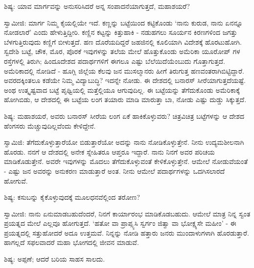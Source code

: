 ಶಿಷ್ಯ: ಯಾವ ಮಾರ್ಗವನ್ನು ಅನುಸರಿಸಿದರೆ ಅನ್ನ ಸಂಪಾದನೆಯಾಗುತ್ತದೆ, ಮಹಾಶಯರೆ?

ಸ್ವಾಮೀಜಿ: ಮಾರ್ಗ ನಿಮ್ಮ ಕೈಯಲ್ಲಿಯೇ ಇದೆ. ಕಣ್ಣನ್ನು ಬಟ್ಟೆಯಿಂದ ಕಟ್ಟಿಕೊಂಡು ‘ನಾನು ಕುರುಡ, ನಾನು ಏನನ್ನೂ ನೋಡಲಾರೆ’ ಎಂದು ಹೇಳುತ್ತಿದ್ದೀರಿ. ಕಣ್ಣಿನ ಕಟ್ಟನ್ನು ಕಿತ್ತುಹಾಕಿ - ನಡುಹಗಲು ಸೂರ್ಯನ ಕಿರಣಗಳಿಂದ ಜಗತ್ತು ಬೆಳಗುತ್ತಿರುವುದು ಕಣ್ಣಿಗೆ ಬೀಳುತ್ತದೆ. ಹಣ ದೊರೆಯದಿದ್ದರೆ ಜಹಜಿನಲ್ಲಿ ಕೂಲಿಯಾಗಿ ವಿದೇಶಕ್ಕೆ ಹೊರಟುಹೋಗಿ. ಸ್ವದೇಶಿ ಬಟ್ಟೆ, ಚೌಕ, ಮೊರ, ಪೊರಕೆ ಇವುಗಳನ್ನು ತಲೆಯ ಮೇಲೆ ಹೊತ್ತುಕೊಂಡು ಅಮೆರಿಕಾ ಯೂರೋಪ್ ಗಳ ರಸ್ತೆಗಳಲ್ಲಿ ತಿರುಗಿ; ಹಿಂದೂದೇಶದ ಪದಾರ್ಥಗಳಿಗೆ ಈಗಲೂ ಎಷ್ಟು ಬೆಲೆಯಿದೆಯೆಂಬುದು ಗೊತ್ತಾಗುತ್ತದೆ. ಅಮೆರಿಕಾದಲ್ಲಿ ನೋಡಿದೆ - ಹೂಗ್ಲಿ ಜಿಲ್ಲೆಯ ಕೆಲವು ಜನ ಮುಸಲ್ಮಾನರು ಹೀಗೆ ತಿರುಗುತ್ತ ಹಣವಂತರಾಗಿಬಿಟ್ಟಿದ್ದಾರೆ. ಅವರದಕ್ಕಿಂತಲೂ ಕಡೆಯೇ ನಿಮ್ಮ ವಿದ್ಯಾಬುದ್ಧಿ? ಇದನ್ನೇ ನೋಡು. ಈ ದೇಶದಲ್ಲಿ ಬನಾರಸ್ ಸೀರೆಯಾಗುತ್ತದೆಯಷ್ಟೆ. ಅಂಥ ಉತ್ಕೃಷ್ಟವಾದ ಬಟ್ಟೆ ಪೃಥ್ವಿಯಲ್ಲಿ ಮತ್ತೆಲ್ಲಿಯೂ ಆಗುವುದಿಲ್ಲ. ಈ ಬಟ್ಟೆಯನ್ನು ತೆಗೆದುಕೊಂಡು ಅಮೆರಿಕಾಕ್ಕೆ ಹೋಗಿಬಿಡು, ಆ ದೇಶದಲ್ಲಿ ಈ ಬಟ್ಟೆಯ ಲಂಗ ತಯಾರು ಮಾಡಿ ಮಾರುತ್ತಾ ಬಾ, ನೋಡು ಎಷ್ಟು ದುಡ್ಡು ಸಿಕ್ಕುತ್ತದೆ.

ಶಿಷ್ಯ: ಮಹಾಶಯರೆ, ಅವರು ಬನಾರಸ್ ಸೀರೆಯ ಲಂಗ ಏಕೆ ಹಾಕಿಕೊಳ್ಳುವರು? ಚಿತ್ರವಿಚಿತ್ರ ಬಟ್ಟೆಗಳನ್ನು ಆ ದೇಶದ ಹೆಂಗಸರು ಮೆಚ್ಚುವುದಿಲ್ಲವೆಂದು ಕೇಳಿದ್ದೇನೆ.

ಸ್ವಾಮಿಜಿ: ತೆಗೆದುಕೊಳ್ಳುತ್ತಾರೆಯೋ ಬಿಡುತ್ತಾರೆಯೋ ಅದನ್ನು ನಾನು ನೋಡಿಕೊಳ್ಳುತ್ತೇನೆ. ನೀನು ಉದ್ಯಮಶೀಲನಾಗಿ ಹೊರಡು. ನನಗೆ ಆ ದೇಶದಲ್ಲಿ ಅನೇಕ ಸ್ನೇಹಿತರೂ ಆಪ್ತರೂ ಇದ್ದಾರೆ. ನಾನು ನಿನಗೆ ಅವರ ಪರಿಚಯ ಮಾಡಿಕೊಡುತ್ತೇನೆ. ಅವರೇ ಇವುಗಳನ್ನು ಮೊದಲು ತೆಗೆದುಕೊಳ್ಳುವಂತೆ ಕೇಳಿಕೊಳ್ಳುತ್ತೇನೆ. ಆಮೇಲೆ ನೋಡುವೆಯಂತೆ - ಎಷ್ಟು ಜನ ಅವರನ್ನು ಅನುಕರಣ ಮಾಡುತ್ತಾರೆ ಅಂತ. ನೀನು ಆಮೇಲೆ ಪದಾರ್ಥಗಳನ್ನು ಒದಗಿಸಲಾರದೆ ಹೋಗುವೆ.

ಶಿಷ್ಯ: ಕಸುಬನ್ನು ಕೈಕೊಳ್ಳುವುದಕ್ಕೆ ಮೂಲಧನವೆಲ್ಲಿಂದ ತರೋಣ?

ಸ್ವಾಮೀಜಿ: ನಾನು ಏನುಮಾಡಬಹುದೆಂದರೆ, ನಿನಗೆ ಕಾರ್ಯಾರಂಭ ಮಾಡಿಕೊಡಬಹುದು. ಆಮೇಲೆ ಮಾತ್ರ ನಿನ್ನ ಸ್ವಂತ ಪ್ರಯತ್ನದ ಮೇಲೆ ಎಲ್ಲವೂ ಹೋಗುತ್ತದೆ. ‘ಹತೋ ವಾ ಪ್ರಾಪ್ಸ್ಯಸಿ ಸ್ವರ್ಗಂ ಜಿತ್ವಾ ವಾ ಭೋಕ್ಷ್ಯಸೇ ಮಹೀಂ’ - ಈ ಪ್ರಯತ್ನದಲ್ಲಿ ಸತ್ತುಹೋದರೆ ಅದೂ ಉತ್ತಮವೆ. ನಿನ್ನನ್ನು ನೋಡಿ ಹತ್ತಾರು ಜನರು ಮುಂದಾಳುಗಳಾಗಿ ಹೊರಡುತ್ತಾರೆ. ಹಾಗಲ್ಲದೆ ಸಫಲವಾದರೆ ಮಹಾ ಭೋಗದಲ್ಲಿ ಜೀವನ ಮಾಡುವೆ.

ಶಿಷ್ಯ: ಅಪ್ಪಣೆ; ಆದರೆ ಬರಿಯ ಸಾಹಸ ಸಾಲದು.

